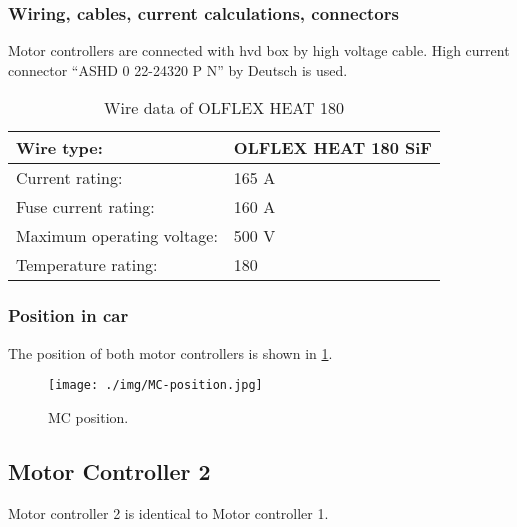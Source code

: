 \subsubsection{Wiring, cables, current calculations, connectors}

Motor controllers are connected with \gls{hvd} box by high voltage cable. High current connector “ASHD 0 22-24320 P N” by Deutsch is used. 

\begin{table}[H]
	\centering
	\caption{Wire data of OLFLEX HEAT 180}
	\begin{tabu}{|X|X|}\hline
		Wire type: & OLFLEX HEAT 180 SiF  \\\hline
		Current rating: & 165 A \\\hline
		Fuse current rating: & 160 A \\\hline
		Maximum operating voltage: & 500 V \\\hline
		Temperature rating: & 180 \degC \\\hline
	\end{tabu}%
	\label{tab:MC:wire}%
\end{table}%

\subsubsection{Position in car}

The position of both motor controllers is shown in \ref{fig:MC:position}.

\begin{figure}[H]
	\centering
	\texttt{[image: ./img/MC-position.jpg]}
	\caption{MC position.}
	\label{fig:MC:position}
\end{figure}
\subsection{Motor Controller 2}
Motor controller 2 is identical to Motor controller 1.




